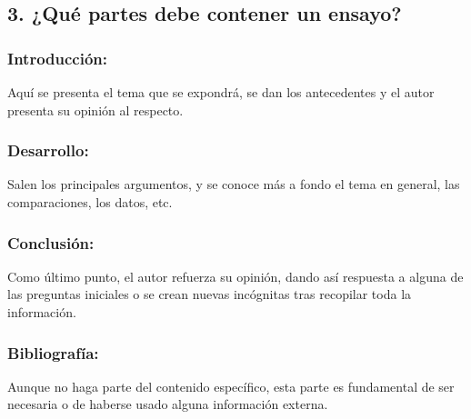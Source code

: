 \documentclass[a4paper,man,natbib]{apa6}
\begin{document}
\subsection{3. ¿Qué partes debe contener un ensayo?}{

    \subsubsection{Introducción:}
    Aquí se presenta el tema que se expondrá, se dan los antecedentes y el autor presenta su opinión al respecto.
    \subsubsection{Desarrollo:}
    Salen los principales argumentos, y se conoce más a fondo el tema en general, las comparaciones, los datos, etc.
    \subsubsection{Conclusión:}
    Como último punto, el autor refuerza su opinión, dando así respuesta a alguna de las preguntas iniciales o se crean nuevas incógnitas tras recopilar toda la información.
    \subsubsection{Bibliografía:}
    Aunque no haga parte del contenido específico, esta parte es fundamental de ser necesaria o de haberse usado alguna información externa.

}
\end{document}
